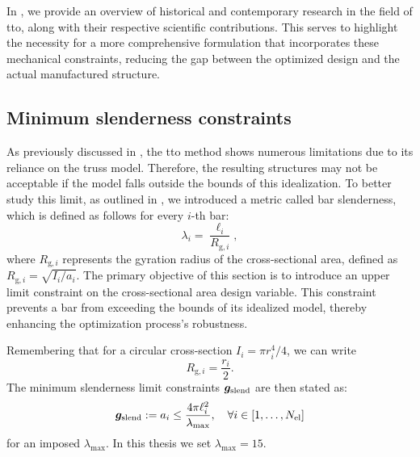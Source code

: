 In , we provide an overview of historical and contemporary research in the field of \gls{tto}, along with their respective scientific contributions. This serves to highlight the necessity for a more comprehensive formulation that incorporates these mechanical constraints, reducing the gap between the optimized design and the actual manufactured structure.
    
\subsection{Minimum slenderness constraints}
As previously discussed in , the \gls{tto} method shows numerous limitations due to its reliance on the truss model. Therefore, the resulting structures may not be acceptable if the model falls outside the bounds of this idealization. To better study this limit, as outlined in , we introduced a metric called bar slenderness, which is defined as follows for every $i$-th bar:
\begin{equation}
    \lambda_i = \frac{\ell_i}{R_{\text{g},i}},
\end{equation}
where $R_{\text{g},i}$ represents the gyration radius of the cross-sectional area, defined as $R_{\text{g},i} = \sqrt{I_i/a_i}$.
The primary objective of this section is to introduce an upper limit constraint on the cross-sectional area design variable. This constraint prevents a bar from exceeding the bounds of its idealized model, thereby enhancing the optimization process's robustness.

Remembering that for a circular cross-section $I_i = \pi r_i^4/4$, we can write
\begin{equation}
    R_{\text{g},i} = \frac{r_i}{2}.
\end{equation}
The minimum slenderness limit constraints $\bm{g}_{\text{slend}}$ are then stated as:
\begin{equation} \label{eq:04_slend_constraints}
    \bm{g}_{\text{slend}}:=a_i \leq \frac{4 \pi \ell_i^2}{\lambda_{\text{max}}}, \quad \forall i \in [1,\ldots, N_{\text{el}}]
\end{equation}
for an imposed $\lambda_{\text{max}}$. In this thesis we set $\lambda_{\text{max}}=15$.

